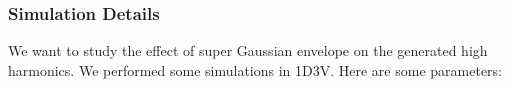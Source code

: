 \documentclass{beamer}
\begin{document}
\begin{frame}
    \frametitle{Simulation Details}
    \small
    We want to study the effect of super Gaussian envelope on the generated high harmonics. We performed some simulations in 1D3V. Here are some parameters:


\end{frame}
\end{document}
